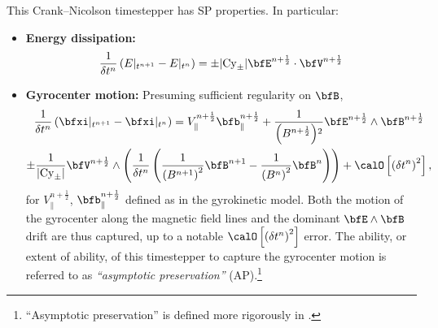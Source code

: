     This Crank--Nicolson timestepper has SP properties. In particular:
    \begin{itemize}
        \item  {\bf Energy dissipation:}
        \begin{equation}
            \frac{1}{\delta t^{n}}\left(E|_{t^{n + 1}} - E|_{t^{n}}\right)
                =  \pm |\rmCy_{\pm}|\bfE^{n + \frac{1}{2}}\cdot\bfV^{n + \frac{1}{2}}
        \end{equation}
        \item  {\bf Gyrocenter motion:} Presuming sufficient regularity on $\bfB$,
        \begin{multline}
            \frac{1}{\delta t^{n}}\left(\bfxi|_{t^{n + 1}} - \bfxi|_{t^{n}}\right)
                =  V_{\parallel}^{n + \frac{1}{2}}\bfb_{\parallel}^{n + \frac{1}{2}}
                + \frac{1}{\left(B^{n + \frac{1}{2}}\right)\!^{2}}\bfE^{n + \frac{1}{2}}\wedge\bfB^{n + \frac{1}{2}}  \\
                \pm \frac{1}{|\rmCy_{\pm}|}\bfV^{n + \frac{1}{2}}\wedge\left(\frac{1}{\delta t^{n}}\left(\frac{1}{\left(B^{n + 1}\right)^{2}}\bfB^{n + 1} - \frac{1}{\left(B^{n}\right)^{2}}\bfB^{n}\right)\right) + \calO\left[\left(\delta t^{n}\right)^{2}\right],
        \end{multline}
        for $V_{\parallel}^{n + \frac{1}{2}}$, $\bfb_{\parallel}^{n + \frac{1}{2}}$ defined as in the gyrokinetic model. Both the motion of the gyrocenter along the magnetic field lines and the dominant $\bfE\wedge\bfB$ drift are thus captured, up to a notable $\calO\left[\left(\delta t^{n}\right)^{2}\right]$ error. The ability, or extent of ability, of this timestepper to capture the gyrocenter motion is referred to as \emph{``asymptotic preservation''} (AP).\footnote{``Asymptotic preservation'' is defined more rigorously in \cite{Ricketson_Chacón_2020}.}
    \end{itemize}

    \shortline

